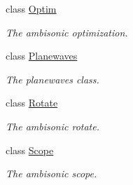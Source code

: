 \begin{DoxyCompactItemize}
class \hyperlink{class_hoa3_d_1_1_optim}{Optim}
\begin{DoxyCompactList}\small\item\em The ambisonic optimization. \end{DoxyCompactList}\item 
class \hyperlink{class_hoa3_d_1_1_planewaves}{Planewaves}
\begin{DoxyCompactList}\small\item\em The planewaves class. \end{DoxyCompactList}\item 
class \hyperlink{class_hoa3_d_1_1_rotate}{Rotate}
\begin{DoxyCompactList}\small\item\em The ambisonic rotate. \end{DoxyCompactList}\item 
class \hyperlink{class_hoa3_d_1_1_scope}{Scope}
\begin{DoxyCompactList}\small\item\em The ambisonic scope. \end{DoxyCompactList}\end{DoxyCompactItemize}
